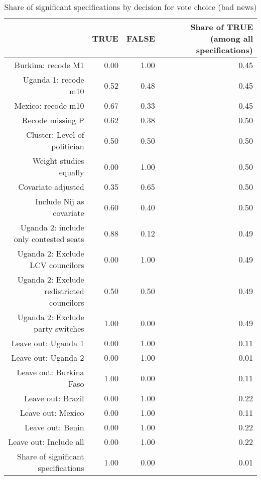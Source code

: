 \begin{table}[ht]
\centering
\caption{Share of significant specifications by decision for vote choice (bad news)} 
\label{tab:spec_m1b}
\begin{tabular}{rrrr}
  \hline
 & TRUE & FALSE & Share of TRUE (among all specifications) \\ 
  \hline
Burkina: recode M1 & 0.00 & 1.00 & 0.45 \\ 
  Uganda 1: recode m10 & 0.52 & 0.48 & 0.45 \\ 
  Mexico: recode m10 & 0.67 & 0.33 & 0.45 \\ 
  Recode missing P & 0.62 & 0.38 & 0.50 \\ 
  Cluster: Level of politician & 0.50 & 0.50 & 0.50 \\ 
  Weight studies equally & 0.00 & 1.00 & 0.50 \\ 
  Covariate adjusted & 0.35 & 0.65 & 0.50 \\ 
  Include Nij as covariate & 0.60 & 0.40 & 0.50 \\ 
  Uganda 2: include only contested seats & 0.88 & 0.12 & 0.49 \\ 
  Uganda 2: Exclude LCV councilors & 0.00 & 1.00 & 0.49 \\ 
  Uganda 2: Exclude redistricted councilors & 0.50 & 0.50 & 0.49 \\ 
  Uganda 2: Exclude party switches & 1.00 & 0.00 & 0.49 \\ 
  Leave out: Uganda 1 & 0.00 & 1.00 & 0.11 \\ 
  Leave out: Uganda 2 & 0.00 & 1.00 & 0.01 \\ 
  Leave out: Burkina Faso & 1.00 & 0.00 & 0.11 \\ 
  Leave out: Brazil & 0.00 & 1.00 & 0.22 \\ 
  Leave out: Mexico & 0.00 & 1.00 & 0.11 \\ 
  Leave out: Benin & 0.00 & 1.00 & 0.22 \\ 
  Leave out: Include all & 0.00 & 1.00 & 0.22 \\ 
  Share of significant specifications & 1.00 & 0.00 & 0.01 \\ 
   \hline
\end{tabular}
\end{table}
